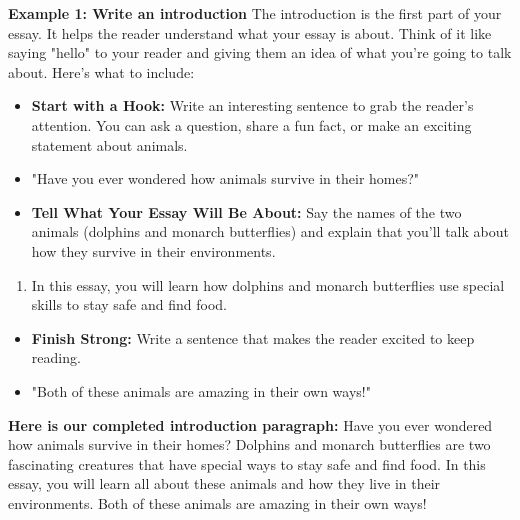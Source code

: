 \documentclass[12pt]{article}
\begin{document}
\vspace{1em}
\begin{tcolorbox}[colframe=black!60, colback=white, 
coltitle=black, colbacktitle=black!15, fonttitle=\bfseries\Large, 
title=Examples, halign title=center, left=10pt, right=10pt, top=10pt, bottom=15pt]

\textbf{Example 1: Write an introduction}
The introduction is the first part of your essay. It helps the reader understand what your essay is about. Think of it like saying "hello" to your reader and giving them an idea of what you're going to talk about. Here's what to include: 
  \begin{itemize}
    \item \textbf{Start with a Hook:} Write an interesting sentence to grab the reader's attention. 
          You can ask a question, share a fun fact, or make an exciting statement about animals.
    \item "Have you ever wondered how animals survive in their homes?"
\end{itemize}

\begin{itemize}
    \item \textbf{Tell What Your Essay Will Be About:} Say the names of the two animals 
          (dolphins and monarch butterflies) and explain that you’ll talk about how they survive in their environments.
\end{itemize}

\begin{enumerate}
    \item In this essay, you will learn how dolphins and monarch butterflies use special skills 
          to stay safe and find food.
\end{enumerate}

\begin{itemize}
    \item \textbf{Finish Strong:} Write a sentence that makes the reader excited to keep reading.
    \item "Both of these animals are amazing in their own ways!"
\end{itemize}

\textbf{Here is  our completed introduction paragraph:} Have you ever wondered how animals survive in their homes? Dolphins and monarch butterflies are two fascinating creatures that have special ways to stay safe and find food. In this essay, you will learn all about these animals and how they live in their environments. Both of these animals are amazing in their own ways! 







     \end{tcolorbox}
\end{document}
